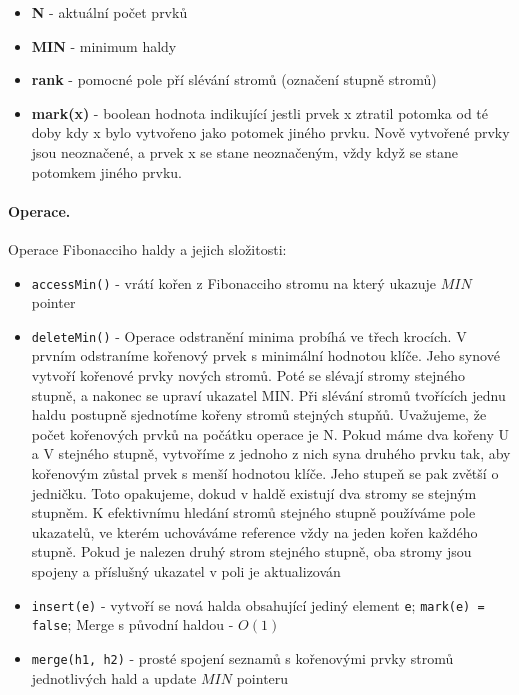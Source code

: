 \begin{itemize}[itemsep=0px]
\item \textbf{N} - aktuální počet prvků
\item \textbf{MIN} - minimum haldy
\item \textbf{rank} - pomocné pole pří slévání stromů (označení stupně stromů)
\item \textbf{mark(x)} - boolean hodnota indikující jestli prvek x ztratil potomka od té doby kdy x bylo vytvořeno jako potomek jiného prvku. Nově vytvořené prvky jsou neoznačené, a prvek x se stane neoznačeným, vždy když se stane potomkem jiného prvku.
\end{itemize}

\paragraph{Operace.} Operace Fibonacciho haldy a jejich složitosti:

\begin{itemize}[itemsep=0pt, topsep=2pt]
    \item \texttt{accessMin()} - vrátí kořen z Fibonacciho stromu na který ukazuje $MIN$ pointer
    \item \texttt{deleteMin()} - Operace odstranění minima probíhá ve třech krocích. V prvním odstraníme kořenový prvek s minimální hodnotou klíče. Jeho synové vytvoří kořenové prvky nových stromů. Poté se slévají stromy stejného stupně, a nakonec se upraví ukazatel MIN. Při slévání stromů tvořících jednu haldu postupně sjednotíme kořeny stromů stejných stupňů. Uvažujeme, že počet kořenových prvků na počátku operace je N. Pokud máme dva kořeny U a V stejného stupně, vytvoříme z jednoho z nich syna druhého prvku tak, aby kořenovým zůstal prvek s menší hodnotou klíče. Jeho stupeň se pak zvětší o jedničku. Toto opakujeme, dokud v haldě existují dva stromy se stejným stupněm. K efektivnímu hledání stromů stejného stupně používáme pole ukazatelů, ve kterém uchováváme reference vždy na jeden kořen každého stupně. Pokud je nalezen druhý strom stejného stupně, oba stromy jsou spojeny a příslušný ukazatel v poli je aktualizován
    \item \texttt{insert(e)} - vytvoří se nová halda obsahující jediný element \texttt{e}; \texttt{mark(e) = false}; Merge s původní haldou - $O(1)$
    \item \texttt{merge(h1, h2)} - prosté spojení seznamů s kořenovými prvky stromů jednotlivých hald a update $MIN$ pointeru
\end{itemize}

